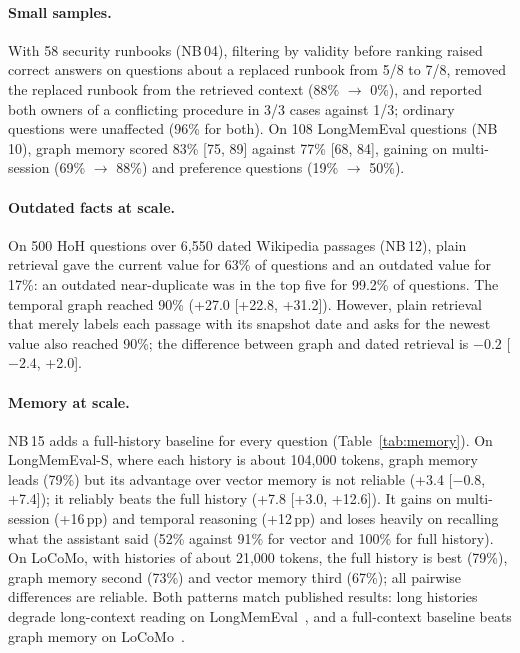 \documentclass[11pt,a4paper]{article}
\newcommand{\pp}{\,pp}
\newcommand{\nb}[1]{NB\,#1}
\begin{document}
\paragraph{Small samples.} With 58 security runbooks (\nb{04}), filtering by validity before ranking raised
correct answers on questions about a replaced runbook from 5/8 to 7/8, removed the replaced runbook from the
retrieved context (88\% $\rightarrow$ 0\%), and reported both owners of a conflicting procedure in 3/3 cases
against 1/3; ordinary questions were unaffected (96\% for both). On 108 LongMemEval questions (\nb{10}), graph
memory scored 83\% [75, 89] against 77\% [68, 84], gaining on multi-session (69\% $\rightarrow$ 88\%) and
preference questions (19\% $\rightarrow$ 50\%).

\paragraph{Outdated facts at scale.} On 500 HoH questions over 6{,}550 dated Wikipedia passages (\nb{12}),
plain retrieval gave the current value for 63\% of questions and an outdated value for 17\%: an outdated
near-duplicate was in the top five for 99.2\% of questions. The temporal graph reached 90\% (+27.0 [+22.8, +31.2]).
However, plain retrieval that merely labels each passage with its snapshot date and asks for the newest value also
reached 90\%; the difference between graph and dated retrieval is $-0.2$ [$-2.4$, +2.0].

\paragraph{Memory at scale.} \nb{15} adds a full-history baseline for every question (Table~\ref{tab:memory}). On
LongMemEval-S, where each history is about 104{,}000 tokens, graph memory leads (79\%) but its advantage over
vector memory is not reliable (+3.4 [$-0.8$, +7.4]); it reliably beats the full history (+7.8 [+3.0, +12.6]). It
gains on multi-session (+16\pp) and temporal reasoning (+12\pp) and loses heavily on recalling what the assistant
said (52\% against 91\% for vector and 100\% for full history). On LoCoMo, with histories of about 21{,}000 tokens,
the full history is best (79\%), graph memory second (73\%) and vector memory third (67\%); all pairwise differences
are reliable. Both patterns match published results: long histories degrade long-context reading on
LongMemEval~\cite{wu2025longmemeval}, and a full-context baseline beats graph memory on LoCoMo~\cite{chhikara2025mem0}.
\end{document}
